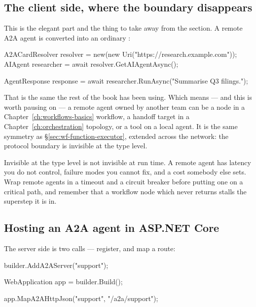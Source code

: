 \subsection{The client side, where the boundary disappears}

This is the elegant part and the thing to take away from the section. A remote
A2A agent is converted into an ordinary :

\begin{csharp}[caption={A remote agent, locally}, label={lst:host-a2a-client}]
A2ACardResolver resolver = new(new Uri("https://research.example.com"));
AIAgent researcher = await resolver.GetAIAgentAsync();

AgentResponse response = await researcher.RunAsync("Summarise Q3 filings.");
\end{csharp}

That is the same  the rest of the book has been using. Which means ---
and this is worth pausing on --- a remote agent owned by another team can be a
node in a Chapter~\ref{ch:workflows-basics} workflow, a handoff target in a
Chapter~\ref{ch:orchestration} topology, or a tool on a local agent. It is the
same symmetry as \S\ref{sec:wf-function-executor}, extended across the network:
the protocol boundary is invisible at the type level.

\begin{warning}
Invisible at the type level is not invisible at run time. A remote agent has
latency you do not control, failure modes you cannot fix, and a cost somebody
else sets. Wrap remote agents in a timeout and a circuit breaker before putting
one on a critical path, and remember that a workflow node which never returns
stalls the superstep it is in.
\end{warning}

\subsection{Hosting an A2A agent in ASP.NET Core}

The server side is two calls --- register, and map a route:

\begin{csharp}[caption={Exposing an agent over A2A}, label={lst:host-a2a-server}]
builder.AddA2AServer("support");

WebApplication app = builder.Build();

app.MapA2AHttpJson("support", "/a2a/support");
\end{csharp}

